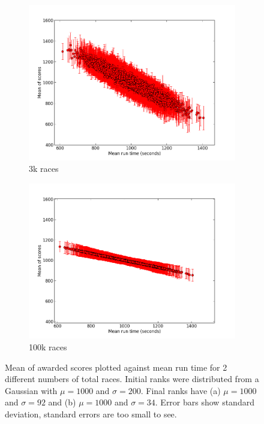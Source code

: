 \begin{figure}[h]     
    \begin{center} 
    	\begin{subfigure}{0.49\textwidth}                       
        	\includegraphics[width=\textwidth]{./images/diffAbilities10errorsGaussConstantInit3k.png}
        	\caption{3k races}
        \end{subfigure}
        \begin{subfigure}{0.49\textwidth}                       
        	\includegraphics[width=\textwidth]{./images/diffAbilities10errorsGaussConstantInit100k.png}
        	\caption{100k races}
        \end{subfigure}
	\end{center}
	\caption{Mean of awarded scores plotted against mean run time for 2 different numbers of total races. Initial ranks were distributed from a Gaussian with $\mu=1000$ and $\sigma=200$. Final ranks have (a) $\mu=1000$ and $\sigma=92$ and (b) $\mu=1000$ and $\sigma=34$. Error bars show standard deviation, standard errors are too small to see.}
	\label{fig:doubleFigure}
\end{figure}\\
%
\FloatBarrier
